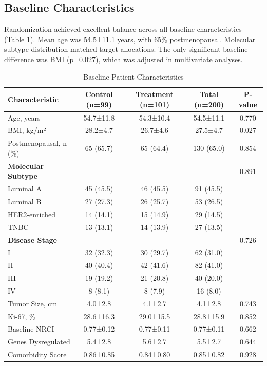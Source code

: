 \documentclass[12pt,a4paper]{article}
\begin{document}
\subsection{Baseline Characteristics}

Randomization achieved excellent balance across all baseline characteristics (Table 1). Mean age was 54.5±11.1 years, with 65\% postmenopausal. Molecular subtype distribution matched target allocations. The only significant baseline difference was BMI (p=0.027), which was adjusted in multivariate analyses.

\begin{table}[H]
\centering
\caption{Baseline Patient Characteristics}
\begin{tabular}{lcccc}
\toprule
\textbf{Characteristic} & \textbf{Control (n=99)} & \textbf{Treatment (n=101)} & \textbf{Total (n=200)} & \textbf{P-value} \\
\midrule
Age, years & 54.7±11.8 & 54.3±10.4 & 54.5±11.1 & 0.770 \\
BMI, kg/m² & 28.2±4.7 & 26.7±4.6 & 27.5±4.7 & 0.027 \\
Postmenopausal, n (\%) & 65 (65.7) & 65 (64.4) & 130 (65.0) & 0.854 \\
\midrule
\textbf{Molecular Subtype} & & & & 0.891 \\
\quad Luminal A & 45 (45.5) & 46 (45.5) & 91 (45.5) & \\
\quad Luminal B & 27 (27.3) & 26 (25.7) & 53 (26.5) & \\
\quad HER2-enriched & 14 (14.1) & 15 (14.9) & 29 (14.5) & \\
\quad TNBC & 13 (13.1) & 14 (13.9) & 27 (13.5) & \\
\midrule
\textbf{Disease Stage} & & & & 0.726 \\
\quad I & 32 (32.3) & 30 (29.7) & 62 (31.0) & \\
\quad II & 40 (40.4) & 42 (41.6) & 82 (41.0) & \\
\quad III & 19 (19.2) & 21 (20.8) & 40 (20.0) & \\
\quad IV & 8 (8.1) & 8 (7.9) & 16 (8.0) & \\
\midrule
Tumor Size, cm & 4.0±2.8 & 4.1±2.7 & 4.1±2.8 & 0.743 \\
Ki-67, \% & 28.6±16.3 & 29.0±15.5 & 28.8±15.9 & 0.852 \\
Baseline NRCI & 0.77±0.12 & 0.77±0.11 & 0.77±0.11 & 0.662 \\
Genes Dysregulated & 5.4±2.8 & 5.6±2.7 & 5.5±2.7 & 0.644 \\
Comorbidity Score & 0.86±0.85 & 0.84±0.80 & 0.85±0.82 & 0.928 \\
\bottomrule
\end{tabular}
\end{table}
\end{document}
